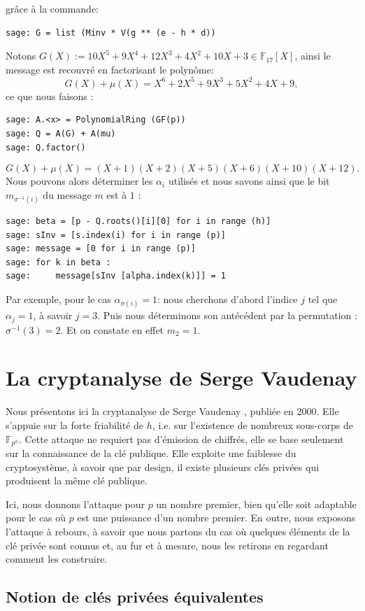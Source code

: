 \documentclass[a4paper, titlepage, 11pt]{article}
\theoremstyle{definition}
\theoremstyle{remark}
\def\gf #1{\mathbb{F}_{#1}}
\begin{document}
grâce à la commande:
\begin{verbatim}
sage: G = list (Minv * V(g ** (e - h * d))
\end{verbatim}
Notons $G(X) := 10X^5 + 9X^4 + 12X^3 + 4X^2 + 10X + 3 \in \gf{17}[X]$, ainsi le message est recouvré en factorisant le polynôme:
$$G(X) + \mu(X) = X^6 + 2X^5 + 9X^3 + 5X^2 + 4X + 9,$$
ce que nous faisons :
\begin{verbatim}
sage: A.<x> = PolynomialRing (GF(p))
sage: Q = A(G) + A(mu)
sage: Q.factor()
\end{verbatim}
$$G(X) + \mu(X) = (X + 1)(X + 2)(X + 5)(X + 6)(X + 10)(X + 12).$$
Nous pouvons alors déterminer les $\alpha_i$ utilisés et nous savons ainsi que le bit $m_{\sigma^{-1}(i)}$ du message $m$ est à $1$ :
\begin{verbatim}
sage: beta = [p - Q.roots()[i][0] for i in range (h)]
sage: sInv = [s.index(i) for i in range (p)]
sage: message = [0 for i in range (p)]
sage: for k in beta :
sage:     message[sInv [alpha.index(k)]] = 1
\end{verbatim}
Par exemple, pour le cas $\alpha_{\sigma(i)} = 1$: nous cherchons d'abord l'indice $j$ tel que $\alpha_j = 1$, à savoir $j = 3$. Puis nous déterminons son antécédent par la permutation : $\sigma^{-1}(3) = 2$. Et on constate en effet $m_2 = 1$.

\section{La cryptanalyse de Serge Vaudenay}\label{sec:cryptanalyse}

Nous présentons ici la cryptanalyse de Serge Vaudenay \cite{vaudenay2000}, publiée en 2000. Elle s'appuie sur la forte friabilité de $h$, i.e. sur l'existence de nombreux sous-corps de $\gf{p^h}$. Cette attaque ne requiert pas d'émission de chiffrés, elle se base seulement sur la connaissance de la clé publique. Elle exploite une faiblesse du cryptosystème, à savoir que par design, il existe plusieurs clés privées qui produisent la même clé publique.

Ici, nous donnons l'attaque pour $p$ un nombre premier, bien qu'elle soit adaptable pour le cas où $p$ est une puissance d'un nombre premier. En outre, nous exposons l'attaque à rebours, à savoir que nous partons du cas où quelques éléments de la clé privée sont connus et, au fur et à mesure, nous les retirons en regardant comment les construire.

\subsection{Notion de clés privées équivalentes}
\end{document}
